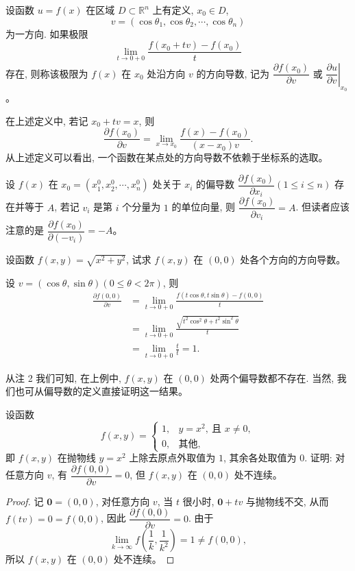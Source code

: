 \documentclass[12pt,fontset=fandol]{ctexart}
\begin{document}
\begin{definition}\label{course-definition-14-1-2}\quad 设函数 $u=f(x)$ 在区域 $D\subset\mathbb R^n$ 上有定义, $x_0\in D$,
\[
  v=(\cos\theta_1,\cos\theta_2,\cdots,\cos\theta_n)
\]
为一方向. 如果极限
\[
  \lim_{t\to0+0}\frac{f(x_0+tv)-f(x_0)}{t}
\]
存在, 则称该极限为 $f(x)$ 在 $x_0$ 处沿方向 $v$ 的方向导数, 记为 $\dfrac{\partial f(x_0)}{\partial v}$ 或 $\left.\dfrac{\partial u}{\partial v}\right|_{x_0}$。

\end{definition}
\noindent{}\quad 在上述定义中, 若记 $x_0+tv=x$, 则
\[
  \frac{\partial f(x_0)}{\partial v}
  =\lim_{x\to x_0}\frac{f(x)-f(x_0)}{(x-x_0)v}.
\]
从上述定义可以看出, 一个函数在某点处的方向导数不依赖于坐标系的选取。

\noindent{}\quad 设 $f(x)$ 在 $x_0=(x_1^0,x_2^0,\cdots,x_n^0)$ 处关于 $x_i$ 的偏导数 $\dfrac{\partial f(x_0)}{\partial x_i}(1\leqslant i\leqslant n)$ 存在并等于 $A$, 若记 $v_i$ 是第 $i$ 个分量为 $1$ 的单位向量, 则 $\dfrac{\partial f(x_0)}{\partial v_i}=A$. 但读者应该注意的是 $\dfrac{\partial f(x_0)}{\partial(-v_i)}=-A$。

\begin{example}\label{course-example-14-1-3}\quad 设函数 $f(x,y)=\sqrt{x^2+y^2}$, 试求 $f(x,y)$ 在 $(0,0)$ 处各个方向的方向导数。

\end{example}
\begin{solve}\quad 设 $v=(\cos\theta,\sin\theta)(0\leqslant\theta<2\pi)$, 则
\[
\begin{aligned}
  \frac{\partial f(0,0)}{\partial v}
  &=\lim_{t\to0+0}
  \frac{f(t\cos\theta,t\sin\theta)-f(0,0)}{t}\\
  &=\lim_{t\to0+0}
  \frac{\sqrt{t^2\cos^2\theta+t^2\sin^2\theta}}{t}\\
  &=\lim_{t\to0+0}\frac{t}{t}=1.
\end{aligned}
\]

从注 2 我们可知, 在上例中, $f(x,y)$ 在 $(0,0)$ 处两个偏导数都不存在. 当然, 我们也可从偏导数的定义直接证明这一结果。

\end{solve}
\begin{example}\label{course-example-14-1-4}\quad 设函数
\[
  f(x,y)=
  \begin{cases}
    1, & y=x^2,\ \text{且 } x\ne0,\\
    0, & \text{其他},
  \end{cases}
\]
即 $f(x,y)$ 在抛物线 $y=x^2$ 上除去原点外取值为 $1$, 其余各处取值为 $0$. 证明: 对任意方向 $v$, 有 $\dfrac{\partial f(0,0)}{\partial v}=0$, 但 $f(x,y)$ 在 $(0,0)$ 处不连续。

\end{example}
\begin{proof}\quad 记 $\mathbf 0=(0,0)$, 对任意方向 $v$, 当 $t$ 很小时, $\mathbf 0+tv$ 与抛物线不交, 从而 $f(tv)=0=f(0,0)$, 因此 $\dfrac{\partial f(0,0)}{\partial v}=0$. 由于
\[
  \lim_{k\to\infty}f\left(\frac1k,\frac1{k^2}\right)=1\ne f(0,0),
\]
所以 $f(x,y)$ 在 $(0,0)$ 处不连续。

\end{proof}
\end{document}

